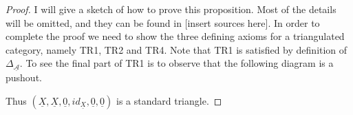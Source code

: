 \documentclass[12pt]{article}
\theoremstyle{definition}
\theoremstyle{remark}
\begin{document}
            \begin{proof}
                I will give a sketch of how to prove this proposition. Most of the details will be omitted, and they can be found in [insert sources here]. In order to complete the proof we need to show the three defining axioms for a triangulated category, namely TR1, TR2 and TR4. Note that TR1 is satisfied by definition of $\Delta_{\underline{\mathcal{A}}}$. To see the final part of TR1 is to observe that the following diagram is a pushout.
                \begin{center}
                \end{center}
                Thus $(\underline{X},\underline{X},\underline{0},id_{\underline{X}},\underline{0},\underline{0})$ is a standard triangle.

                

\end{proof}
\end{document}
